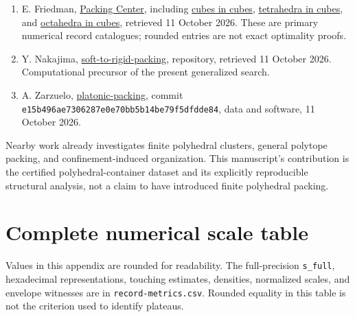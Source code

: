 \documentclass[11pt,a4paper]{article}
\begin{document}
\begin{enumerate}
\item E. Friedman, \href{https://erich-friedman.github.io/packing/index.html}{Packing Center}, including \href{https://erich-friedman.github.io/packing/cubincub/}{cubes in cubes}, \href{https://erich-friedman.github.io/packing/tetincub/}{tetrahedra in cubes}, and \href{https://erich-friedman.github.io/packing/octincub/}{octahedra in cubes}, retrieved 11 October 2026. These are primary numerical record catalogues; rounded entries are not exact optimality proofs.
\item Y. Nakajima, \href{https://github.com/yoheinakajima/soft-to-rigid-packing}{soft-to-rigid-packing}, repository, retrieved 11 October 2026. Computational precursor of the present generalized search.
\item A. Zarzuelo, \href{https://github.com/alejandrozu/platonic-packing}{platonic-packing}, commit \nolinkurl{e15b496ae7306287e0e70bb5b14be79f5dfdde84}, data and software, 11 October 2026.
\end{enumerate}

Nearby work already investigates finite polyhedral clusters, general polytope packing, and confinement-induced organization. This manuscript's contribution is the certified polyhedral-container dataset and its explicitly reproducible structural analysis, not a claim to have introduced finite polyhedral packing.

\appendix
\section{Complete numerical scale table}

Values in this appendix are rounded for readability. The full-precision \nolinkurl{s_full}, hexadecimal representations, touching estimates, densities, normalized scales, and envelope witnesses are in \nolinkurl{record-metrics.csv}. Rounded equality in this table is not the criterion used to identify plateaus.
\end{document}

